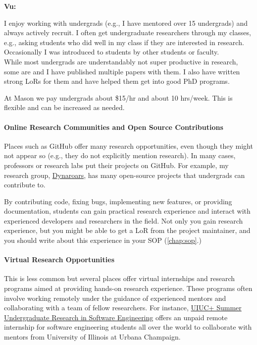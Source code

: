 \documentclass[oneside,11pt,dvipsnames]{book}
\newenvironment{commentbox}[1][]{
  \small
  \begin{mybox}
    {\small \textbf{#1}}
  }{
  \end{mybox}
}
\begin{document}
\begin{commentbox}[Vu:]
    I enjoy working with undergrads (e.g., I have mentored over 15 undergrads) and always actively recruit.
    I often get undergraduate researchers through my classes, e.g., asking students who did well in my class if they are interested in research.  Occasionally I was introduced to students by other students or faculty.\\

    While most undergrads are understandably not super productive in research, some are and I have published multiple papers with them.  I also have written strong LoRs for them and have helped them get into good PhD programs.

    \tcblower
    At Mason we pay undergrads about \$15/hr and about 10 hrs/week. This is flexible and can be increased as needed.
\end{commentbox}

\paragraph{Online Research Communities and Open Source Contributions} Places such as GitHub offer many research opportunities, even though they might not appear so (e.g., they do not explicitly mention research).
In many cases, professors or research labs put their projects on GitHub. For example, my research group, \href{https://github.com/dynaroars/}{Dynaroars}, has many open-source projects that undergrads can contribute to.

By contributing code, fixing bugs, implementing new features, or providing documentation, students can gain practical research experience and interact with experienced developers and researchers in the field. Not only you gain research experience, but you might be able to get a LoR from the project maintainer, and you should write about this experience in your SOP (\autoref{chap:sop}.)

\paragraph{Virtual Research Opportunities} This is less common but several places offer virtual internships and research programs aimed at providing hands-on research experience. These programs often involve working remotely under the guidance of experienced mentors and collaborating with a team of fellow researchers. For instance, \href{https://docs.google.com/forms/d/1btIwt4HwjyKMOUk-EMy3rbkfWzFxv2lNrMm_zkd0pA4/viewform?edit_requested=true}{UIUC+ Summer Undergraduate Research in Software Engineering}  offers an unpaid remote internship for software engineering students all over the world to collaborate with mentors from University of Illinois at Urbana Champaign.
\end{document}
